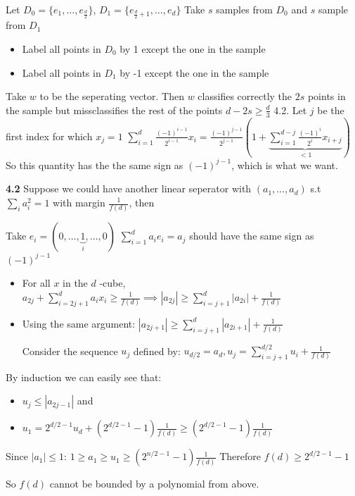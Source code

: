 \documentclass[11pt]{article}
\begin{document}
Let \(D_0 = \{e_1, \ldots, e_{\frac d2} \}\), \(D_1 = \{e_{\frac d2 + 1}, \ldots, e_d\}\)
Take \(s\) samples from \(D_0\) and \(s\) sample from \(D_1\)
\begin{itemize}
\item Label all points in \(D_0\) by 1 except the one in the sample
\item Label all points in \(D_1\) by -1 except the one in the sample
\end{itemize}
   Take \(w\) to be the seperating vector. Then \(w\) classifies correctly the \(2s\) points in the sample but missclassifies the rest of the points \(d - 2s \ge \frac d3\)
4.2.
Let \(j\) be the first index for which \(x_j = 1\)
\(\sum_{i=1}^d \frac{(-1)^{i-1}}{2^{i-1}} x_i = \frac{(-1)^{j-1}}{2^{j-1}} ( 1 + \underbrace{\sum_{i=1}^{d-j} \frac{(-1)^{i}}{2^{i}} x_{i+j}}_{ <1})\)
So this quantity has the the same sign as \((-1)^{j-1}\), which is what we want.


\textbf{4.2}
Suppose we could have another linear seperator with \((a_1, \ldots, a_d)\) s.t \(\sum_i a_i^2 = 1\) with margin \(\frac1{f(d)}\), then

Take \(e_i = (0, \ldots , \underbrace{1}_i,\ldots,0)\)
\(\sum_{i=1}^d a_i e_i =  a_j\) should have the same sign as \((-1)^{j-1}\)


\begin{itemize}
\item For all \(x\) in the \(d\) -cube,  \(a_{2j} + \sum_{i=2j+1}^{d} a_i x_i \ge \frac1{f(d)} \implies |a_{2j}| \ge \sum_{i=j+1}^{d} |a_{2i}|  + \frac1{f(d)}\)
\item Using the same argument: \(|a_{2j+1}| \ge \sum_{i=j+1}^{d} |a_{2i+1}|  + \frac1{f(d)}\)

Consider the sequence \(u_j\) defined by:
\(u_{d/2} = a_d, u_j = \sum_{i=j+1}^{d/2} u_i + \frac{1}{f(d)}\)
\end{itemize}

By induction we can easily see that:
\begin{itemize}
\item \(u_j \le |a_{2j-1}|\) and
\item \(u_1  = 2^{d/2-1} u_d + (2^{d/2-1} -1)\frac1{f(d)} \ge (2^{d/2-1} -1)\frac1{f(d)}\)
\end{itemize}

Since \(|a_1| \le 1\):
  \(1 \ge a_1 \ge u_1 \ge (2^{n/2-1}-1)\frac{1}{f(d)}\)
  Therefore
  \(f(d) \ge 2^{d/2-1}-1\)

So \(f(d)\) cannot be bounded by a polynomial from above.
\end{document}
